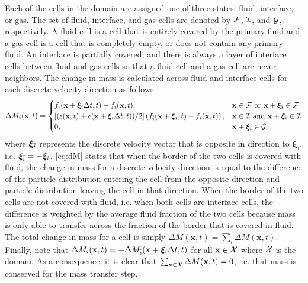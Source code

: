 \documentclass[pdftex,ms]{pittetd}
\newcommand{\pos}{\mathbf{x}}
\newcommand{\pvel}{\boldsymbol{\xi}}
\begin{document}
Each of the cells in the domain are assigned one of three states: fluid, interface, or gas.
The set of fluid, interface, and gas cells are denoted by $\mathcal{F}$, $\mathcal{I}$, and $\mathcal{G}$, respectively.
A fluid cell is a cell that is entirely covered by the primary fluid and a gas cell is a cell that is completely empty, or does not contain any primary fluid.
An interface is partially covered, and there is always a layer of interface cells between fluid and gas cells so that a fluid cell and a gas cell are never neighbors.
The change in mass is calculated across fluid and interface cells for each discrete velocity direction as follows:
\begin{equation} \label{eq:dM}
\Delta M_i(\pos, t) = \begin{cases}
f_\opidx(\pos + \pvel_i \Delta t, t) - f_i(\pos, t), & \pos \in \fset \text{ or } \pos + \pvel_i \in \fset \\
\left[(\epsilon(\pos, t) + \epsilon(\pos + \pvel_i \Delta t, t)) / 2\right]\left(f_\opidx(\pos + \pvel_i, t) - f_i(\pos, t)\right), & \pos \in \iset \text{ and } \pos + \pvel_i \in \iset \\
0, & \pos + \pvel_i \in \gset
\end{cases}
\end{equation}
\noindent where $\pvel_\opidx$ represents the discrete velocity vector that is opposite in direction to $\pvel_i$, i.e. $\pvel_\opidx = - \pvel_i$.
\eqref{eq:dM} states that when the border of the two cells is covered with fluid, the change in mass for a discrete velocity direction is equal to the difference of the particle distribution entering the cell from the opposite direction and particle distribution leaving the cell in that direction.
When the border of the two cells are not covered with fluid, i.e. when both cells are interface cells, the difference is weighted by the average fluid fraction of the two cells because mass is only able to transfer across the fraction of the border that is covered in fluid.
The total change in mass for a cell is simply $\Delta M(\pos, t) = \sum_i \Delta M(\pos, t)$.
Finally, note that $\Delta M_i(\pos, t) = -\Delta M_\opidx(\pos + \pvel_i \Delta t, t)$ for all $\pos \in \domain$ where $\mathcal{X}$ is the domain.
As a consequence, it is clear that $\sum_{\pos \in \domain}\Delta M(\pos, t) = 0$, i.e. that mass is conserved for the mass transfer step.

\newcommand{\tconst}{\delta_{trans}}
\end{document}
